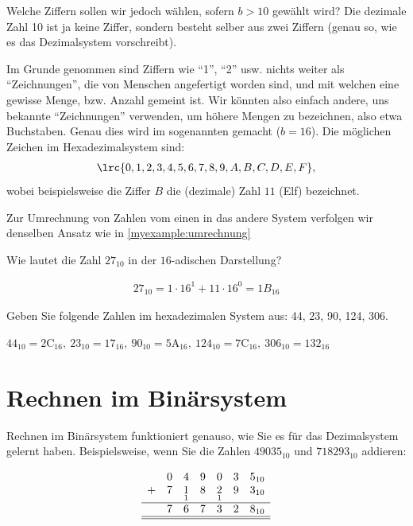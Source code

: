 Welche Ziffern sollen wir jedoch wählen, sofern $b>10$ gewählt wird? Die dezimale Zahl 10 ist ja keine Ziffer, sondern besteht selber aus zwei Ziffern (genau so, wie es das Dezimalsystem vorschreibt).

Im Grunde genommen sind Ziffern wie \enquote{1}, \enquote{2} usw. nichts weiter als \enquote{Zeichnungen}, die von Menschen angefertigt worden sind, und mit welchen eine gewisse Menge, bzw. Anzahl gemeint ist. Wir könnten also einfach andere, uns bekannte \enquote{Zeichnungen} verwenden, um höhere Mengen zu bezeichnen, also etwa Buchstaben. Genau dies wird im sogenannten  gemacht ($b=16$). Die möglichen Zeichen im Hexadezimalsystem sind:
\begin{align*}
	\lrc{0,1,2,3,4,5,6,7,8,9,A,B,C,D,E,F},
\end{align*}
wobei beispielsweise die Ziffer $B$ die (dezimale) Zahl $11$ (Elf) bezeichnet.

Zur Umrechnung von Zahlen vom einen in das andere System verfolgen wir denselben Ansatz wie in \cref{myexample:umrechnung}

\begin{myexercise}
	Wie lautet die Zahl $27_{10}$ in der $16$-adischen Darstellung?
	\begin{myanswer}
		\begin{align*}
			27_{10} = 1\cdot 16^1 + 11\cdot 16^0 = 1B_{16}
		\end{align*}
	\end{myanswer}
\end{myexercise}

\begin{myexercise}
	Geben Sie folgende Zahlen im hexadezimalen System aus: 44, 23, 90, 124, 306.
	\begin{myanswer}
		$44_{10} = 2\text{C}_{16},\ 23_{10} = 17_{16},\ 90_{10} = 5\text{A}_{16},\ 124_{10} = 7\text{C}_{16},\ 306_{10} = 132_{16}$
	\end{myanswer}
\end{myexercise}


\section{Rechnen im Binärsystem}

Rechnen im Binärsystem funktioniert genauso, wie Sie es für das Dezimalsystem gelernt haben. Beispielsweise, wenn Sie die Zahlen $49035_{10}$ und $718293_{10}$ addieren:

\[
	\begin{array}{ccccccc}
		  & 0              & 4               & 9              & 0               & 3              & 5_{10}              \\
		+ & \underset{}{7} & \underset{1}{1} & \underset{}{8} & \underset{1}{2} & \underset{}{9} & \underset{}{3_{10}} \\
		\hline
		  & 7              & 6               & 7              & 3               & 2              & 8_{10}              \\\hline\hline
	\end{array}
\]

